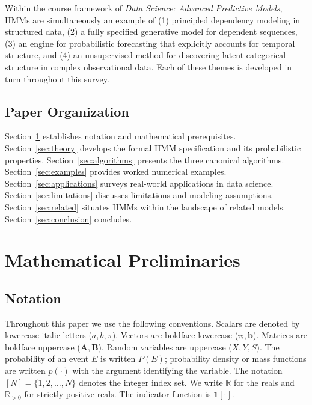 \documentclass[conference]{IEEEtran}
\begin{document}
Within the course framework of \emph{Data Science: Advanced Predictive Models}, HMMs are simultaneously an example of (1) principled dependency modeling in structured data, (2) a fully specified generative model for dependent sequences, (3) an engine for probabilistic forecasting that explicitly accounts for temporal structure, and (4) an unsupervised method for discovering latent categorical structure in complex observational data. Each of these themes is developed in turn throughout this survey.

\subsection{Paper Organization}
Section~\ref{sec:prelim} establishes notation and mathematical prerequisites. Section~\ref{sec:theory} develops the formal HMM specification and its probabilistic properties. Section~\ref{sec:algorithms} presents the three canonical algorithms. Section~\ref{sec:examples} provides worked numerical examples. Section~\ref{sec:applications} surveys real-world applications in data science. Section~\ref{sec:limitations} discusses limitations and modeling assumptions. Section~\ref{sec:related} situates HMMs within the landscape of related models. Section~\ref{sec:conclusion} concludes.

\section{Mathematical Preliminaries}
\label{sec:prelim}

\subsection{Notation}

Throughout this paper we use the following conventions. Scalars are denoted by lowercase italic letters ($a, b, \pi$). Vectors are boldface lowercase ($\boldsymbol{\pi}, \mathbf{b}$). Matrices are boldface uppercase ($\mathbf{A}, \mathbf{B}$). Random variables are uppercase ($X, Y, S$). The probability of an event $E$ is written $P(E)$; probability density or mass functions are written $p(\cdot)$ with the argument identifying the variable. The notation $[N] = \{1, 2, \ldots, N\}$ denotes the integer index set. We write $\mathbb{R}$ for the reals and $\mathbb{R}_{>0}$ for strictly positive reals. The indicator function is $\mathbf{1}[\cdot]$.
\end{document}
